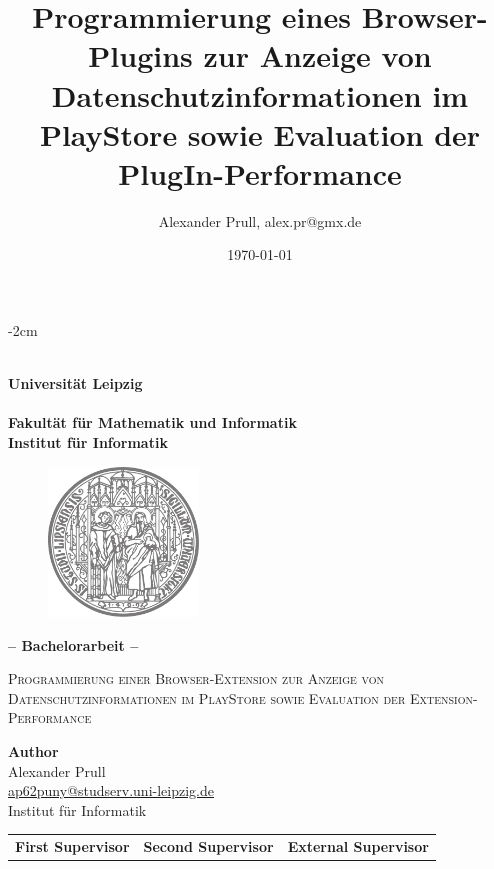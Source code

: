 \documentclass[11pt, a4paper, twoside, openright, final]{book}
\author{Alexander Prull, alex.pr@gmx.de}
\title{Programmierung eines Browser-Plugins zur Anzeige von Datenschutzinformationen im PlayStore sowie Evaluation der PlugIn-Performance}
\date{\today} %
\numberwithin{equation}{chapter}		%
\newcommand{\1}{\mathbbm{1}}
\begin{document}

\begin{titlepage}
	\begin{adjustwidth*}{}{-2cm}
		\begin{center}
			~\\		%
			\textbf{\Huge \sffamily	Universität Leipzig	\\	\small ~					\\
					\large \sffamily	Fakultät für Mathematik und Informatik	 \\
										Institut für Informatik				\\}
			
			\vspace{0.3cm}
			\begin{figure}[H]
	        	\hspace{5.1cm}
	       		\includegraphics[width=4cm]{siegel.png}
	        \end{figure}
	        \vspace{0.15cm}
			\textbf{\Large \sffamily -- Bachelorarbeit --}
			\vspace{0.5cm}
			
			 \textsc{ \LARGE
			Programmierung einer Browser-Extension zur Anzeige von Datenschutzinformationen im PlayStore sowie Evaluation der Extension-Performance}
			
			\vspace{1.0cm}
			\textbf{Author} \\
		Alexander Prull \\ 
		\href{mailto:ap62puny@studserv.uni-leipzig.de}{ap62puny@studserv.uni-leipzig.de} \\
		Institut für Informatik \\
		\end{center}
		
		\vfill
		
		\begin{tabular}{*{3}{C{4cm}}}
			\small \textbf{First Supervisor} & 
			\small \textbf{Second Supervisor} & 
			\small \textbf{External Supervisor} \\
			

\end{tabular}
\end{adjustwidth*}
\end{titlepage}
\end{document}
